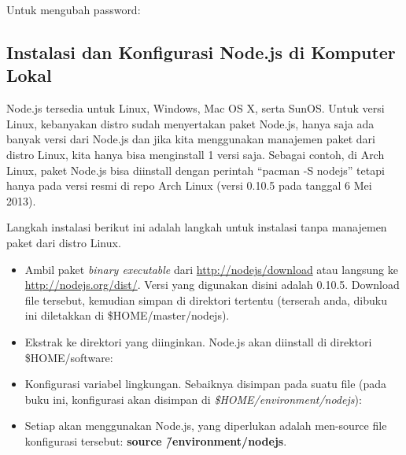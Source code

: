 Untuk mengubah password:

\lstset{language=bash,caption=Mengubah password server}


\subsection{Instalasi dan Konfigurasi Node.js di Komputer Lokal}

Node.js tersedia untuk Linux, Windows, Mac OS X, serta SunOS. Untuk versi Linux, kebanyakan distro sudah menyertakan paket Node.js, hanya saja ada banyak versi dari Node.js dan jika kita menggunakan manajemen paket dari distro Linux, kita hanya bisa menginstall 1 versi saja. Sebagai contoh, di Arch Linux, paket Node.js bisa diinstall dengan perintah ``pacman -S nodejs'' tetapi hanya pada versi resmi di repo Arch Linux (versi 0.10.5 pada tanggal 6 Mei 2013). 

Langkah instalasi berikut ini adalah langkah untuk instalasi tanpa manajemen paket dari distro Linux.
\begin{itemize}
  \item Ambil paket \textit{binary executable} dari \url{http://nodejs/download} atau langsung ke \url{http://nodejs.org/dist/}. Versi yang digunakan disini adalah 0.10.5. Download file tersebut, kemudian simpan di direktori tertentu (terserah anda, dibuku ini diletakkan di \$HOME/master/nodejs).

\lstset{language=bash,caption=Hasil dari download Node.js}


  \item Ekstrak ke direktori yang diinginkan. Node.js akan diinstall di direktori \$HOME/software:

\lstset{language=bash,caption=Ekstraksi Node.js}


  \item Konfigurasi variabel lingkungan. Sebaiknya disimpan pada suatu file (pada buku ini, konfigurasi akan disimpan di \textit{\$HOME/environment/nodejs}):

\lstset{language=bash,caption=Konfigurasi variabel lingkungan Node.js}


  \item Setiap akan menggunakan Node.js, yang diperlukan adalah men-source file konfigurasi tersebut: \textbf{source \~/environment/nodejs}.
\end{itemize}

